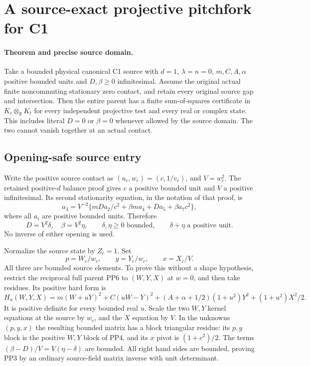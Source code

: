 \section{A source-exact projective pitchfork for C1}
\label{sec:new-c1-projective-pitchfork}

\paragraph{Theorem and precise source domain.}
Take a bounded physical canonical C1 source with $d=1$,
$\lambda=n=0$, $m,C,A,\alpha$ positive bounded units and
$D,\beta\geq0$ infinitesimal. Assume the original actual finite
noncommuting stationary zero contact, and retain every original
source gap and intersection. Then the entire parent has a finite
sum-of-squares certificate in $K_c\otimes_{\mathbb R}K_t$ for
every independent projective test and every real or complex state.
This includes literal $D=0$ or $\beta=0$ whenever allowed by the
source domain. The two cannot vanish together at an actual contact.

\subsection{Opening-safe source entry}

Write the positive source contact as $(u_c,w_c)=(c,1/v_c)$,
and $V=w_c^2$. The retained positive-$d$ balance proof gives
$c$ a positive bounded unit and $V$ a positive infinitesimal.
Its second stationarity equation, in the notation of that proof, is
\[
 a_3=V^{-2}\{mDa_2/c^2+\beta ma_4+Da_5+\beta a_7c^2\},
 \tag{PP1}
\]
where all $a_i$ are positive bounded units. Therefore
\[
 D=V^2\delta,\quad\beta=V^2\eta,\qquad
 \delta,\eta\geq0\text{ bounded},\qquad
 \delta+\eta\text{ a positive unit}.
 \tag{PP2}
\]
No inverse of either opening is used.

Normalize the source state by $Z_c=1$. Set
\[
 p=W_c/w_c,\qquad y=Y_c/w_c,\qquad x=X_c/V.
 \tag{PP3}
\]
All three are bounded source elements. To prove this without a
shape hypothesis, restrict the reciprocal full parent PP6 to
$(W,Y,X)$ at $w=0$, and then take residues. Its positive hard form is
\[
 H_u(W,Y,X)=m(W+uY)^2+C(uW-Y)^2
       +(A+\alpha+1/2)(1+u^2)Y^2+(1+u^2)X^2/2.
 \tag{PP4}
\]
It is positive definite for every bounded real $u$. Scale the two
$W,Y$ kernel equations at the source by $w_c$, and the $X$
equation by $V$. In the unknowns $(p,y,x)$ the resulting bounded
matrix has a block triangular residue: its $p,y$ block is the
positive $W,Y$ block of PP4, and its $x$ pivot is $(1+c^2)/2$.
The terms $(\beta-D)/V=V(\eta-\delta)$ are bounded. All right
hand sides are bounded, proving PP3 by an ordinary source-field
matrix inverse with unit determinant.

